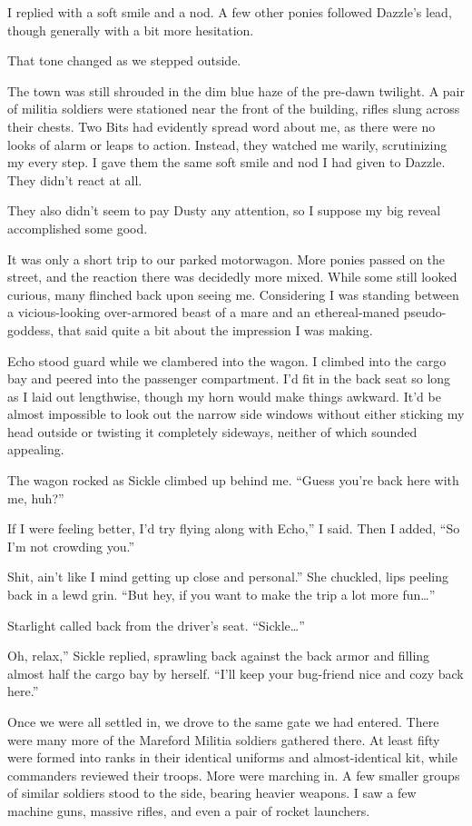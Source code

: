 I replied with a soft smile and a nod. A few other ponies followed Dazzle’s lead, though generally with a bit more hesitation.

That tone changed as we stepped outside.

The town was still shrouded in the dim blue haze of the pre-dawn twilight. A pair of militia soldiers were stationed near the front of the building, rifles slung across their chests. Two Bits had evidently spread word about me, as there were no looks of alarm or leaps to action. Instead, they watched me warily, scrutinizing my every step. I gave them the same soft smile and nod I had given to Dazzle. They didn’t react at all.

They also didn’t seem to pay Dusty any attention, so I suppose my big reveal accomplished some good.

It was only a short trip to our parked motorwagon. More ponies passed on the street, and the reaction there was decidedly more mixed. While some still looked curious, many flinched back upon seeing me. Considering I was standing between a vicious-looking over-armored beast of a mare and an ethereal-maned pseudo-goddess, that said quite a bit about the impression I was making.

Echo stood guard while we clambered into the wagon. I climbed into the cargo bay and peered into the passenger compartment. I’d fit in the back seat so long as I laid out lengthwise, though my horn would make things awkward. It’d be almost impossible to look out the narrow side windows without either sticking my head outside or twisting it completely sideways, neither of which sounded appealing.

The wagon rocked as Sickle climbed up behind me. “Guess you’re back here with me, huh?”

\leavevmode{}If I were feeling better, I’d try flying along with Echo,” I said. Then I added, “So I’m not crowding you.”

\leavevmode{}Shit, ain’t like I mind getting up close and personal.” She chuckled, lips peeling back in a lewd grin. “But hey, if you want to make the trip a lot more fun…”

Starlight called back from the driver’s seat. “Sickle…”

\leavevmode{}Oh, relax,” Sickle replied, sprawling back against the back armor and filling almost half the cargo bay by herself. “I’ll keep your bug-friend nice and cozy back here.”

Once we were all settled in, we drove to the same gate we had entered. There were many more of the Mareford Militia soldiers gathered there. At least fifty were formed into ranks in their identical uniforms and almost-identical kit, while commanders reviewed their troops. More were marching in. A few smaller groups of similar soldiers stood to the side, bearing heavier weapons. I saw a few machine guns, massive rifles, and even a pair of rocket launchers.


